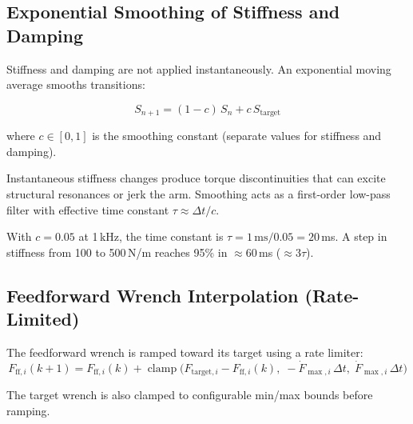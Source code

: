 \documentclass[11pt,a4paper]{article}
\newcommand{\clamp}{\operatorname{clamp}}
\begin{document}
\subsection{Exponential Smoothing of Stiffness and Damping}

Stiffness and damping are not applied instantaneously.  An exponential moving
average smooths transitions:

\begin{keqbox}
\begin{equation}
  S_{n+1} = (1 - c)\,S_n + c\,S_{\text{target}}
  \label{eq:ema}
\end{equation}
\end{keqbox}

where $c \in [0,1]$ is the smoothing constant (separate values for stiffness
and damping).

\begin{reasonbox}
Instantaneous stiffness changes produce torque discontinuities that can excite
structural resonances or jerk the arm.  Smoothing acts as a first-order
low-pass filter with effective time constant $\tau \approx \Delta t / c$.
\end{reasonbox}

\begin{examplebox}
With $c = 0.05$ at 1\,kHz, the time constant is
$\tau = 1\,\text{ms}/0.05 = 20$\,ms.  A step in stiffness from 100 to
500\,N/m reaches 95\% in $\approx 60$\,ms ($\approx 3\tau$).
\end{examplebox}

\subsection{Feedforward Wrench Interpolation (Rate-Limited)}

The feedforward wrench is ramped toward its target using a rate limiter:
\begin{equation}
  F_{\text{ff},i}(k\!+\!1)
  = F_{\text{ff},i}(k)
    + \clamp\!\bigl(
        F_{\text{target},i} - F_{\text{ff},i}(k),\;
        -\dot{F}_{\max,i}\,\Delta t,\;
         \dot{F}_{\max,i}\,\Delta t
      \bigr)
  \label{eq:rate_limit}
\end{equation}

The target wrench is also clamped to configurable min/max bounds before ramping.

\end{document}
